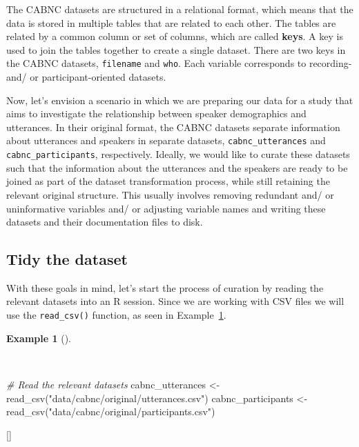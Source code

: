 \documentclass[
  letterpaper,
  krantz1]{latex/krantz-mod}
\newenvironment{Shaded}{\begin{snugshade}}{\end{snugshade}}
\newcommand{\CommentTok}[1]{\textcolor[rgb]{0.00,0.00,0.00}{\textit{#1}}}
\newcommand{\FunctionTok}[1]{\textcolor[rgb]{0.00,0.00,0.00}{#1}}
\newcommand{\NormalTok}[1]{\textcolor[rgb]{0.00,0.00,0.00}{#1}}
\newcommand{\OtherTok}[1]{\textcolor[rgb]{0.00,0.00,0.00}{#1}}
\newcommand{\StringTok}[1]{\textcolor[rgb]{0.00,0.00,0.00}{#1}}
\newcommand{\cindex}[1]{%
  \StrSubstitute{#1}{_}{\_}[\temp]%
  \index{\temp}%
}
\theoremstyle{definition}
\theoremstyle{definition}
\newtheorem{example}{Example}[chapter]
\theoremstyle{remark}
\begin{document}
The CABNC datasets are structured in a relational format, which means
that the data is stored in multiple tables that are related to each
other. The tables are related by a common column or set of columns,
which are called \textbf{keys}. A key is used to
join the tables together to create a single dataset. There are two keys
in the CABNC datasets, \texttt{filename} and \texttt{who}. Each variable
corresponds to recording- and/ or participant-oriented datasets.

Now, let's envision a scenario in which we are preparing our data for a
study that aims to investigate the relationship between speaker
demographics and utterances. In their original format, the CABNC
datasets separate information about utterances and speakers in separate
datasets, \texttt{cabnc\_utterances} and \texttt{cabnc\_participants},
respectively. Ideally, we would like to curate these datasets such that
the information about the utterances and the speakers are ready to be
joined as part of the dataset transformation process, while still
retaining the relevant original structure. This usually involves
removing redundant and/ or uninformative variables and/ or adjusting
variable names and writing these datasets and their documentation files
to disk.

\subsection{Tidy the dataset}\label{tidy-the-dataset}

With these goals in mind, let's start the process of curation by reading
the relevant datasets into an R session. Since we are working with CSV
files we will use the \texttt{read\_csv()} function, as seen in
Example~\ref{exm-curate-cabnc-read}.

\begin{example}[]\protect\hypertarget{exm-curate-cabnc-read}{}\label{exm-curate-cabnc-read}

~

\begin{Shaded}
\begin{Highlighting}[numbers=left,,]
\CommentTok{\# Read the relevant datasets}
\NormalTok{cabnc\_utterances }\OtherTok{\textless{}{-}}
  \FunctionTok{read\_csv}\NormalTok{(}\StringTok{"data/cabnc/original/utterances.csv"}\NormalTok{)}
\NormalTok{cabnc\_participants }\OtherTok{\textless{}{-}}
  \FunctionTok{read\_csv}\NormalTok{(}\StringTok{"data/cabnc/original/participants.csv"}\NormalTok{)}
\end{Highlighting}
\end{Shaded}

\cindex{read_csv()}

\end{example}
\end{document}
